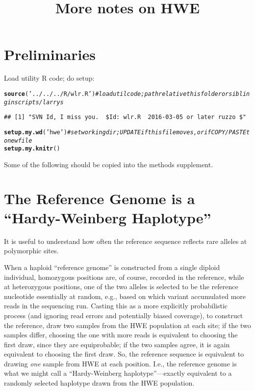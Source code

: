 \documentclass{article}\usepackage[]{graphicx}\usepackage[]{color}
\makeatletter
\newcommand{\hlstr}[1]{\textcolor[rgb]{0.192,0.494,0.8}{#1}}%
\newcommand{\hlcom}[1]{\textcolor[rgb]{0.678,0.584,0.686}{\textit{#1}}}%
\newcommand{\hlstd}[1]{\textcolor[rgb]{0.345,0.345,0.345}{#1}}%
\newcommand{\hlkwd}[1]{\textcolor[rgb]{0.737,0.353,0.396}{\textbf{#1}}}%
\newenvironment{kframe}{%
 \def\at@end@of@kframe{}%
 \ifinner\ifhmode%
  \def\at@end@of@kframe{\end{minipage}}%
  \begin{minipage}{\columnwidth}%
 \fi\fi%
 \def\FrameCommand##1{\hskip\@totalleftmargin \hskip-\fboxsep
 \colorbox{shadecolor}{##1}\hskip-\fboxsep
     \hskip-\linewidth \hskip-\@totalleftmargin \hskip\columnwidth}%
 \MakeFramed {\advance\hsize-\width
   \@totalleftmargin\z@ \linewidth\hsize
   \@setminipage}}%
 {\par\unskip\endMakeFramed%
 \at@end@of@kframe}
\newenvironment{knitrout}{}{} %
\makeatother
\begin{document}
\title{More notes on HWE}
\maketitle

\newif\ifshort\shortfalse

\ifshort\else
\section{Preliminaries}
Load utility R code; do setup:

\begin{knitrout}\footnotesize
{}\color{fgcolor}\begin{kframe}
\begin{alltt}
\hlkwd{source}\hlstd{(}\hlstr{'../../../R/wlr.R'}\hlstd{)} \hlcom{# load util code; path relative this folder or sibling in scripts/larrys }
\end{alltt}
\begin{verbatim}
## [1] "SVN Id, I miss you.  $Id: wlr.R  2016-03-05 or later ruzzo $"
\end{verbatim}
\begin{alltt}
\hlkwd{setup.my.wd}\hlstd{(}\hlstr{'hwe'}\hlstd{)}         \hlcom{# set working dir; UPDATE if this file moves, or if COPY/PASTE to new file}
\hlkwd{setup.my.knitr}\hlstd{()}
\end{alltt}
\end{kframe}
\end{knitrout}

Some of the following should be copied into the methods supplement.
\fi

\section{The Reference Genome is a ``Hardy-Weinberg Haplotype''}
\label{sec:hw-hap}

It is useful to understand how often the reference sequence reflects rare alleles at polymorphic sites.  

When a haploid ``reference genome'' is constructed from a single diploid individual, homozygous 
positions are, of course, recorded in the reference, while at heterozygous positions, one of the two 
alleles is selected to be the reference nucleotide essentially at random, e.g., based on which 
variant accumulated more reads in the sequencing run.  Casting this as a more explicitly 
probabilistic process (and ignoring read errors and potentially biased coverage), to construct the 
reference, draw two samples from the HWE population at each site; if the two samples differ, 
choosing the one with more reads is equivalent to choosing the first draw, since they are 
equiprobable; if the two samples agree, it is again equivalent to choosing the first draw.  So, the 
reference sequence is equivalent to drawing \emph{one} sample from HWE at each position.  I.e., the 
reference genome is what we might call a ``Hardy-Weinberg haplotype''---exactly equivalent to a 
randomly selected haplotype drawn from the HWE population.
\end{document}
